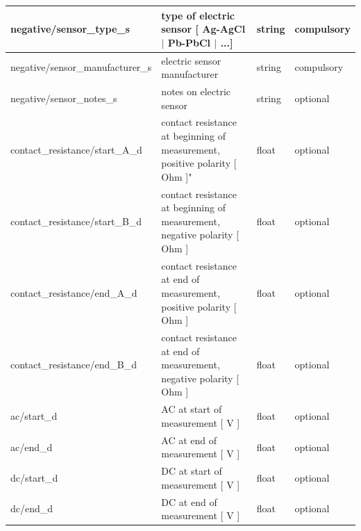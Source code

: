\documentclass{article}
\begin{document}
\begin{table}[htb!]
\begin{tabular}{|l|p{3in}|l|l|}
		negative/sensor\_type\_s & type of electric sensor [ Ag-AgCl $|$ Pb-PbCl $|$ ...] & string & compulsory \\ \hline
		negative/sensor\_manufacturer\_s & electric sensor manufacturer & string & compulsory \\ \hline
		negative/sensor\_notes\_s & notes on electric sensor & string & optional \\ \hline
		contact\_resistance/start\_A\_d & contact resistance at beginning of measurement, positive polarity [ Ohm ]" & float & optional \\ \hline
		contact\_resistance/start\_B\_d & contact resistance at beginning of measurement, negative polarity [ Ohm ] & float & optional \\ \hline
		contact\_resistance/end\_A\_d & contact resistance at end of measurement, positive polarity [ Ohm ] & float & optional \\ \hline
		contact\_resistance/end\_B\_d & contact resistance at end of measurement, negative polarity [ Ohm ] & float & optional \\ \hline
		ac/start\_d & AC at start of measurement [ V ] & float & optional \\ \hline
		ac/end\_d & AC at end of measurement [ V ] & float & optional \\ \hline
		dc/start\_d & DC at start of measurement [ V ] & float & optional \\ \hline
		dc/end\_d & DC at end of measurement [ V ] & float & optional \\ \hline
		
	\end{tabular}
	\label{tab:electric01}
\end{table}	
\end{document}
